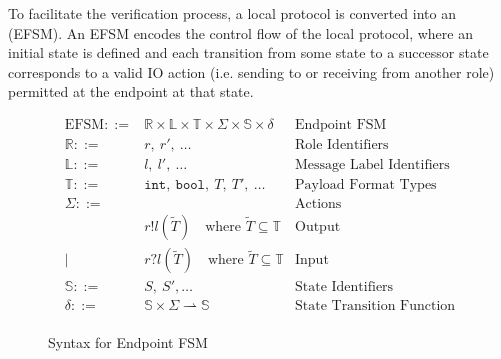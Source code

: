 To facilitate the verification process, a local protocol is converted into 
an  (EFSM). An EFSM encodes the control flow of the local protocol, where an initial state is defined and each transition from some state to a successor state corresponds to a valid IO action (i.e. sending to or receiving from another role) permitted at the endpoint at that state.

\begin{figure}[!hb]
\doublespacing
\[
\begin{array}{rlr}

\text{EFSM} ::= & \mathbb{R} \times \mathbb{L} \times \mathbb{T} \times \Sigma \times \mathbb{S} \times \delta & \text{Endpoint FSM} \\

\mathbb{R} ::= & r,~r',~\dots & \text{Role Identifiers} \\

\mathbb{L} ::= & l,~l',~\dots & \text{Message Label Identifiers} \\

\mathbb{T} ::= & \texttt{int},~\texttt{bool},~T,~T',~\dots & \text{Payload Format Types} \\

\Sigma ::= & & \text{Actions} \\
     & r!l(\tilde{T}) \quad \text{where } \tilde{T} \subseteq \mathbb{T} & \text{Output} \\
\mid & r?l(\tilde{T}) \quad \text{where } \tilde{T} \subseteq \mathbb{T} & \text{Input} \\

\mathbb{S} ::= & S,~S',\dots & \text{State Identifiers} \\

\delta ::= & \mathbb{S} \times \Sigma \rightharpoonup \mathbb{S} & \text{State Transition Function} \\

\end{array}
\]
\singlespacing
\caption{Syntax for Endpoint FSM}
\end{figure}

